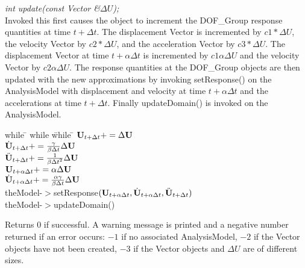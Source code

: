 {\em int update(const Vector \&$\Delta U$);} \\
Invoked this first causes the object to increment the DOF\_Group
response quantities at time $t + \Delta t$. The displacement Vector is  
incremented by $ c1 * \Delta U$, the velocity Vector by $
c2 * \Delta U$, and the acceleration Vector by $c3 * \Delta U$. 
The displacement Vector at time $t + \alpha \Delta t$ is incremented
by $c1 \alpha \Delta U$ and the velocity Vector by $c2 \alpha \Delta U$.
The response quantities at the DOF\_Group objects are then updated
with the new approximations by invoking setResponse() on the
AnalysisModel with displacement and velocity at time $t + \alpha
\Delta t$ and the accelerations at time $t + \Delta t$. 
Finally updateDomain() is invoked on the AnalysisModel. 
\begin{tabbing}
while \= \+ while \= while \= \kill
\>\> $ {\bf U}_{t + \Delta t} += \Delta {\bf U}$ \\
\>\> $ \dot {{\bf U}}_{t + \Delta t} += \frac{\gamma}{\beta \Delta t} \Delta {\bf U} $\\
\>\> $ \ddot {{\bf U}}_{t + \Delta t} += \frac{1}{\beta {\Delta t}^2} \Delta {\bf U} $\\
\>\> $ {\bf U}_{t + \alpha \Delta t} += \alpha \Delta {\bf U} $ \\
\>\> $ \dot{\bf U}_{t + \alpha \Delta t} += \frac{\alpha \gamma}{\beta \Delta t}
\Delta {\bf U} $\\ 
\>\> theModel-$>$setResponse$({\bf U}_{t + \alpha \Delta t}, \dot{\bf U}_{t+\alpha
\Delta t}, \ddot{\bf U}_{t+\Delta t})$ \\
\>\> theModel-$>$updateDomain()
\end{tabbing}
Returns
$0$ if successful. A warning message is printed and a negative number
returned if an error occurs: $-1$ if no associated AnalysisModel, $-2$
if the Vector objects have not been created, $-3$ if the Vector
objects and $\Delta U$ are of different sizes. \\


